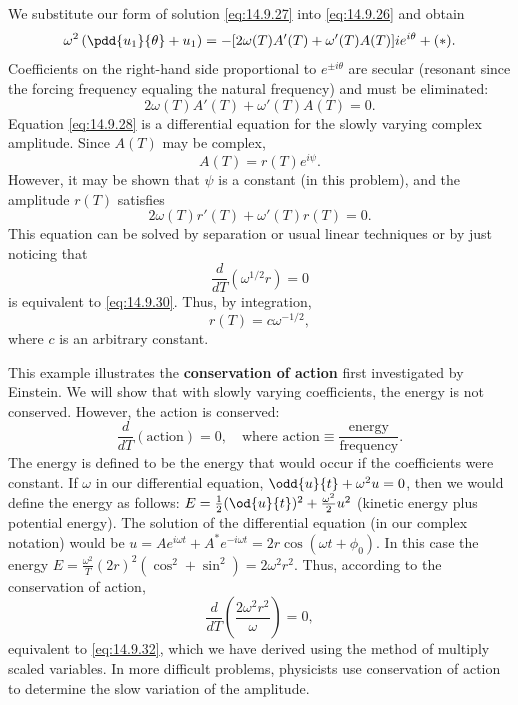 We substitute our form of solution \eqref{eq:14.9.27} into \eqref{eq:14.9.26} and obtain
\[
\omega^2\left(\pdd{u_1}{\theta} + u_1\right) = -[2\omega(T)A'(T) + \omega'(T)A(T)]ie^{i\theta} + (*).
\]
Coefficients on the right-hand side proportional to $e^{\pm i\theta}$ are secular (resonant since the forcing frequency equaling the natural frequency) and must be eliminated:
\begin{equation}
\boxed{2\omega(T)A'(T) + \omega'(T)A(T) = 0.}
\label{eq:14.9.28}
\end{equation}
Equation \eqref{eq:14.9.28} is a differential equation for the slowly varying complex amplitude. Since $A(T)$ may be complex,
\begin{equation}
A(T) = r(T)e^{i\psi}.
\label{eq:14.9.29}
\end{equation}
However, it may be shown that $\psi$ is a constant (in this problem), and the amplitude $r(T)$ satisfies
\begin{equation}
2\omega(T)r'(T) + \omega'(T)r(T) = 0.
\label{eq:14.9.30}
\end{equation}
This equation can be solved by separation or usual linear techniques or by just noticing that
\begin{equation}
\frac{d}{d T}(\omega^{1/2} r) = 0
\label{eq:14.9.31}
\end{equation}
is equivalent to \eqref{eq:14.9.30}. Thus, by integration,
\begin{equation}
\boxed{r(T) = c\omega^{-1/2},}
\label{eq:14.9.32}
\end{equation}
where $c$ is an arbitrary constant.

This example illustrates the \textbf{conservation of action} first investigated by Einstein. We will show that with slowly varying coefficients, the energy is not conserved. However, the action is conserved:
\[
\frac{d}{d T}(\text{action}) = 0, \quad \text{where action} \equiv \frac{\text{energy}}{\text{frequency}}.
\]
The energy is defined to be the energy that would occur if the coefficients were constant. If $\omega$ in our differential equation, $\odd{u}{t} + \omega^2 u = 0$, then we would define the energy as follows: $E = \frac{1}{2}(\od{u}{t})^2 + \frac{\omega^2}{2}u^2$ (kinetic energy plus potential energy). The solution of the differential equation (in our complex notation) would be $u = Ae^{i\omega t} + A^*e^{-i\omega t} = 2r\cos(\omega t + \phi_0)$. In this case the energy $E = \frac{\omega^2}{T}(2r)^2(\cos^2 + \sin^2) = 2\omega^2 r^2$. Thus, according to the conservation of action,
\[
\frac{d}{d T}\left(\frac{2\omega^2 r^2}{\omega}\right) = 0,
\]
equivalent to \eqref{eq:14.9.32}, which we have derived using the method of multiply scaled variables. In more difficult problems, physicists use conservation of action to determine the slow variation of the amplitude.

